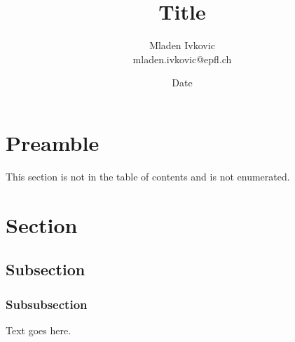 \documentclass[12pt, a4paper, twopage]{scrartcl}
\title{Title}
\author{Mladen Ivkovic\\
mladen.ivkovic@epfl.ch\\
}
\date{Date}
\begin{document}

\maketitle
\clearpage
\tableofcontents
\clearpage





\section*{Preamble}


This section is not in the table of contents and is not enumerated.


\clearpage
















\section{Section}

\subsection{Subsection}

\subsubsection{Subsubsection}

Text goes here.






\end{document}
